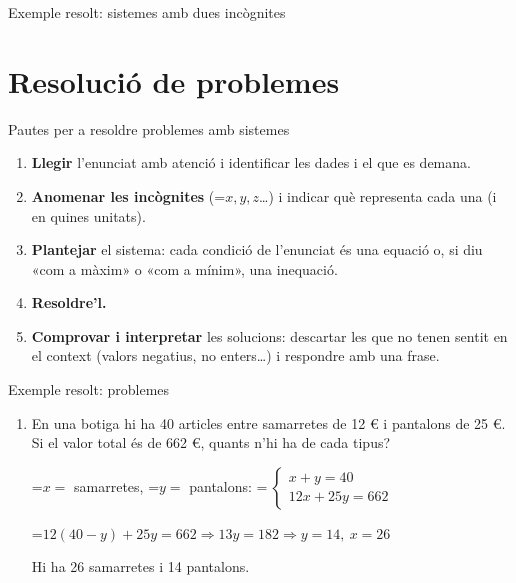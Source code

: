 \documentclass[11pt,a4paper]{article}
\newcommand{\fmm}[1]{\setbox0=\hbox{$#1$}\ifdim\wd0>\linewidth\fmdisp{#1}\else\mbox{\box0}\fi}
\newcommand{\fmdisp}[1]{\[\setbox2=\hbox{$\displaystyle #1$}\ifdim\wd2>\linewidth\resizebox{\linewidth}{!}{\box2}\else\box2\fi\]}
\begin{document}
\begin{fmex}{Exemple resolt: sistemes amb dues incògnites}
\begin{enumerate}[label=\textbf{\arabic*.},leftmargin=*]
\begin{center}\end{center}
\end{enumerate}
\end{fmex}

\section{Resolució de problemes}\hypertarget{sec6}{}
\begin{fmprop}{Pautes per a resoldre problemes amb sistemes}
\begin{enumerate}
\item \textbf{Llegir} l'enunciat amb atenció i identificar les dades i el que es demana.
\item \textbf{Anomenar les incògnites} (\fmm{x,y,z}\dots{}) i indicar què representa cada una (i en quines unitats).
\item \textbf{Plantejar} el sistema: cada condició de l'enunciat és una equació o, si diu «com a màxim» o «com a mínim», una inequació.
\item \textbf{Resoldre'l.}
\item \textbf{Comprovar i interpretar} les solucions: descartar les que no tenen sentit en el context (valors negatius, no enters\dots{}) i respondre amb una frase.
\end{enumerate}
\end{fmprop}

\begin{fmex}{Exemple resolt: problemes}
\begin{enumerate}[label=\textbf{\arabic*.},leftmargin=*]
\item En una botiga hi ha 40 articles entre samarretes de 12 € i pantalons de 25 €. Si el valor total és de 662 €, quants n'hi ha de cada tipus?

\fmm{x=} samarretes, \fmm{y=} pantalons: \fmm{\ \begin{cases}x+y=40\\ 12x+25y=662\end{cases}}

\fmm{12(40-y)+25y=662\Rightarrow13y=182\Rightarrow y=14,\ x=26}

Hi ha 26 samarretes i 14 pantalons.
\end{enumerate}
\end{fmex}

  
\end{document}
